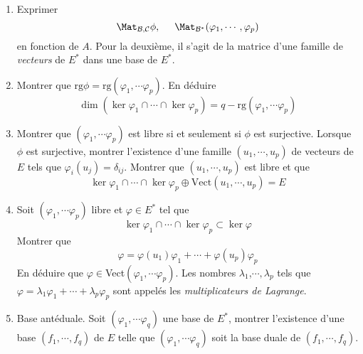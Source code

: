 \begin{enumerate}
\item  Exprimer 
\begin{displaymath}
 \Mat_{\mathcal{B},\mathcal{C}}\phi ,\hspace{0.5cm}\Mat_{\mathcal{B}^*}(\varphi_1,\cdots,\varphi_p)
\end{displaymath}
en fonction de $A$.
Pour la deuxième, il s'agit de la matrice d'une famille de \emph{vecteurs} de $E^*$ dans une base de $E^*$. 

\item  Montrer que $\mathrm{rg}\phi = \mathrm{rg}(\varphi _{1},\cdots \varphi _{p})$. En déduire
\begin{displaymath}
 \dim (\ker \varphi _{1}\cap \cdots \cap \ker \varphi_{p})=q-\mathrm{rg}(\varphi _{1},\cdots \varphi _{p})
\end{displaymath}

\item Montrer que $(\varphi _{1},\cdots \varphi _{p})$ est libre si et seulement si $\phi $ est surjective. Lorsque $\phi$ est surjective, montrer l'existence d'une famille $(u_{1},\cdots ,u_{p})$ de vecteurs de $E$ tels que $\varphi _{i}(u_{j})=\delta _{ij}$. Montrer que $(u_{1},\cdots ,u_{p})$ est libre et que
\[
\ker \varphi _{1}\cap \cdots \cap \ker \varphi _{p}\oplus \text{Vect}%
(u_{1},\cdots ,u_{p})=E
\]

\item  Soit $(\varphi _{1},\cdots \varphi _{p})$ libre et $\varphi \in E^{*}$ tel que 
\begin{displaymath}
\ker \varphi _{1}\cap \cdots \cap \ker \varphi _{p}\subset \ker \varphi  
\end{displaymath}
 Montrer que
\begin{displaymath}
 \varphi =\varphi (u_{1})\varphi _{1}+\cdots +\varphi (u_{p})\varphi _{p}
\end{displaymath}
En déduire que $\varphi \in $Vect$(\varphi _{1},\cdots \varphi _{p})$.\newline
Les nombres $\lambda _{1}$,$\cdots ,\lambda _{p}$ tels que 
$\varphi=\lambda _{1}\varphi _{1}+\cdots +\lambda _{p}\varphi _{p}$ sont appel{\'e}s les \emph{multiplicateurs de Lagrange}.

\item  Base ant{\'e}duale.\newline
Soit $(\varphi _{1},\cdots \varphi _{q})$ une
base de $E^{*}$, montrer l'existence d'une base $(f_{1},\cdots ,f_{q})$ de $E$ telle que $(\varphi _{1},\cdots \varphi _{q})$ soit la base duale de $(f_{1},\cdots ,f_{q})$.


\end{enumerate}